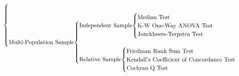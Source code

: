 \documentclass[11pt,a4paper]{ctexart}
\numberwithin{equation}{section}%
\begin{document}
\[{\begin{cases}
            \\
            \\
        \text{Multi-Population Sample}
            \smash[b]{
                \begin{cases}
                    \text{Independent Sample}
                    \smash[t]{
                        \begin{cases}
                            \text{Median Test}\\
                            \text{K-W One-Way ANOVA Test}\\
                            \text{Jonckheere-Terpstra Test}
                        \end{cases}
                    }\\
                    \\
                    \text{Relative Sample}
                    \smash[b]{
                        \begin{cases}
                            \text{Friedman Rank Sum Test}\\
                            \text{Kendall's Coefficient of Concordance Test}\\
                            \text{Cochran Q Test}
                        \end{cases}
                    }
                \end{cases}
            }
    \end{cases}  
    }
\]
\end{document}
